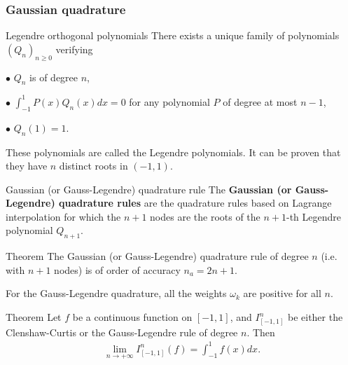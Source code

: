 \documentclass{article}
\begin{document}
        \subsubsection{Gaussian quadrature}

        \vspace{10pt}

        \begin{other}{Legendre orthogonal polynomials}
            There exists a unique family of polynomials $\left(Q_n\right)_{n\geq 0}$ verifying

            $\bullet$ $Q_n$ is of degree $n$,
            
            $\bullet$ $\displaystyle \int_{-1}^1 P(x) Q_n(x) dx = 0$ for any polynomial $P$ of degree at most $n-1$,
            
            $\bullet$ $Q_n(1)=1$.
            
            These polynomials are called the Legendre polynomials. It can be proven that they have $n$ distinct roots in $(-1,1)$.
        \end{other}

        \vspace{10pt}

        \begin{definition}{Gaussian (or Gauss-Legendre) quadrature rule}
            The \textbf{Gaussian (or Gauss-Legendre) quadrature rules} are the quadrature rules based on Lagrange interpolation for which the $n+1$ nodes are the roots of the $n+1$-th Legendre polynomial $Q_{n+1}$.
        \end{definition}

        \vspace{10pt}

        \begin{theorem}{Theorem}
            The Gaussian (or Gauss-Legendre) quadrature rule of degree $n$ (i.e. with $n+1$ nodes) is of order of accuracy $n_a=2n+1$.

            For the Gauss-Legendre quadrature, all the weights $\omega_k$ are positive for all $n$.
        \end{theorem}

        \vspace{10pt}

        \begin{theorem}{Theorem}
            Let $f$ be a continuous function on $[-1,1]$, and $I^n_{[-1,1]}$ be either the Clenshaw-Curtis or the Gauss-Legendre rule of degree $n$. Then
            \begin{align*}
            \lim_{n\to+\infty} I^n_{[-1,1]}(f)  = \int_{-1}^1 f(x) dx .
            \end{align*}
        \end{theorem}
\end{document}
